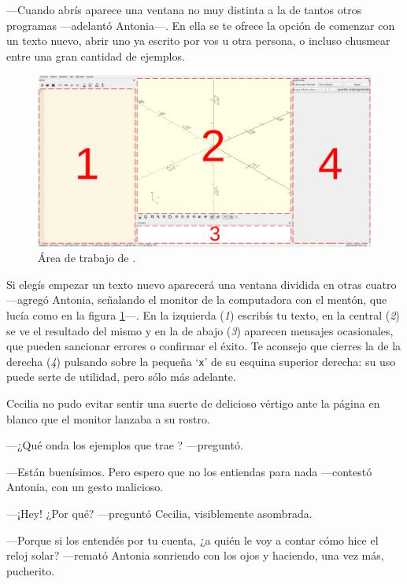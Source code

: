 ---Cuando abrís \openscad{} aparece una ventana no muy distinta a la
de tantos otros programas ---adelantó An\-to\-\mbox{nia---.} En ella se te ofrece
la opción de comenzar con un texto nuevo, abrir uno ya escrito por vos
u otra persona, o incluso chusmear entre una gran cantidad de
ejemplos.


\begin{figure}[t]
  \centering  
  \includegraphics[width=1\textwidth]{imagenes/openscad-pantalla-anotada}
  \caption{Área de trabajo de \openscad.}
  \label{fig:area-trabajo-openscad}
\end{figure}


\guillemotright Si elegís empezar un texto nuevo aparecerá una ventana
dividida en otras cuatro ---agregó Antonia, señalando el monitor de la
computadora con el mentón, que lucía como en la figura
\ref{fig:area-trabajo-openscad}---. En la izquierda (\emph{1})
escribís tu texto, en la central (\emph{2}) se ve el resultado del
mismo y en la de abajo (\emph{3}) aparecen mensajes ocasionales, que
pueden sancionar errores o confirmar el éxito. Te aconsejo que cierres
la de la derecha (\emph{4}) pulsando sobre la pequeña `\texttt{x}' de
su esquina superior derecha: su uso puede serte de utilidad, pero sólo
más adelante.

Cecilia no pudo evitar sentir una suerte de delicioso vértigo ante la
página en blanco que el monitor lanzaba a su rostro.

---¿Qué onda los ejemplos que trae \openscad{}? ---preguntó.

---Están buenísimos. Pero espero que no los entiendas para nada
---contestó Antonia, con un gesto malicioso.

---¡Hey! ¿Por qué? ---preguntó Cecilia, visiblemente asombrada.

---Porque si los entendés por tu cuenta, ¿a quién le voy a contar cómo
hice el reloj solar? ---remató Antonia sonriendo con los ojos y
haciendo, una vez más, pucherito.


